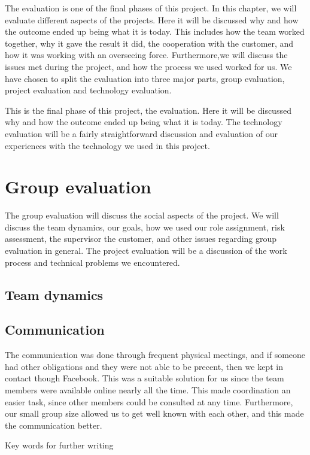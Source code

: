 The evaluation is one of the final phases of this project. In this chapter, we will evaluate different aspects of the projects. 
Here it will be discussed why and how the outcome ended up being what it is today.
This includes how the team worked together, why it gave the result it did, the cooperation with the customer, and how it was working with an overseeing force. Furthermore,we will discuss the issues met during the project, and how the process we used worked for us.
We have chosen to split the evaluation into three major parts, group evaluation, project evaluation and technology evaluation. 
 
 
This is the final phase of this project, the evaluation. Here it will be discussed why and how the outcome
ended up being what it is today.  
The technology evaluation will be a fairly straightforward discussion and evaluation of our experiences with the technology we used in this project.
\section{Group evaluation}
The group evaluation will discuss the social aspects of the project. 
We will discuss the team dynamics, our goals, how we used our role assignment, risk assessment, the supervisor the customer, and other issues regarding group evaluation in general.
The project evaluation will be a discussion of the work process and technical problems we encountered.

\subsection{Team dynamics}

\subsection{Communication}
The communication was done through frequent physical meetings, and if someone had other obligations and they were not able to be precent, then we kept in contact though Facebook. This was a suitable solution for us since the team members were available online nearly all the time. 
This made coordination an easier task, since other members could be consulted at any time. 
Furthermore, our small group size allowed us to get well known with each other, and this made the communication better.

Key words for further writing

